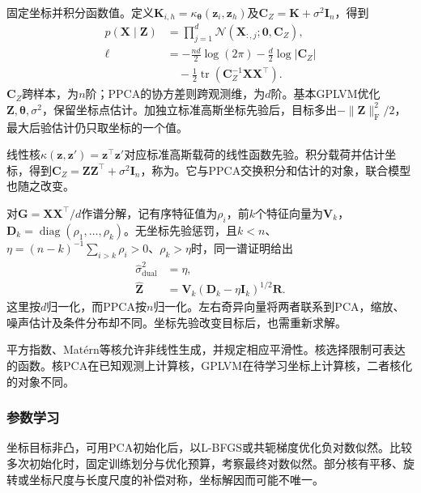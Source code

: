 固定坐标并积分函数值。定义$\bm{K}_{i,h}=\kappa_{\bm{\theta}}(\bm{z}_i,\bm{z}_h)$及$\bm{C}_Z=\bm{K}+\sigma^2\bm{I}_n$，得到
\begin{equation}
\label{eq:dim-gplvm-likelihood}
\begin{aligned}
p(\bm{X}\mid\bm{Z})
&=\prod_{j=1}^d
\mathcal{N}(\bm{X}_{:,j};\bm{0},\bm{C}_Z),\\
\ell&=-\frac{nd}{2}\log(2\pi)
-\frac{d}{2}\log|\bm{C}_Z|\\
&\quad-\frac{1}{2}
\operatorname{tr}(\bm{C}_Z^{-1}\bm{X}\bm{X}^\top).
\end{aligned}
\end{equation}
$\bm{C}_Z$跨样本，为$n$阶；PPCA的协方差则跨观测维，为$d$阶。基本GPLVM优化$\bm{Z},\bm{\theta},\sigma^2$，保留坐标点估计。加独立标准高斯坐标先验后，目标多出$-\lVert\bm{Z}\rVert_{\mathrm{F}}^2/2$，最大后验估计仍只取坐标的一个值。

线性核$\kappa(\bm{z},\bm{z}')=\bm{z}^\top\bm{z}'$对应标准高斯载荷的线性函数先验。积分载荷并估计坐标，得到$\bm{C}_Z=\bm{Z}\bm{Z}^\top+\sigma^2\bm{I}_n$，称为。它与PPCA交换积分和估计的对象，联合模型也随之改变。

对$\bm{G}=\bm{X}\bm{X}^\top/d$作谱分解，记有序特征值为$\rho_i$，前$k$个特征向量为$\bm{V}_k$，$\bm{D}_k=\operatorname{diag}(\rho_1,\ldots,\rho_k)$。无坐标先验惩罚，且$k<n$、$\eta=(n-k)^{-1}\sum_{i>k}\rho_i>0$、$\rho_k>\eta$时，同一谱证明给出
\begin{equation}
\label{eq:dim-gplvm-dual}
\begin{aligned}
\hat{\sigma}_{\mathrm{dual}}^2&=\eta,\\
\hat{\bm{Z}}&=\bm{V}_k(\bm{D}_k-\eta\bm{I}_k)^{1/2}\bm{R}.
\end{aligned}
\end{equation}
这里按$d$归一化，而PPCA按$n$归一化。左右奇异向量将两者联系到PCA，缩放、噪声估计及条件分布却不同。坐标先验改变目标后，也需重新求解。

平方指数、Matérn等核允许非线性生成，并规定相应平滑性。核选择限制可表达的函数。核PCA在已知观测上计算核，GPLVM在待学习坐标上计算核，二者核化的对象不同。

\subsubsection{参数学习}
\label{sec:dim-gplvm-learning}

坐标目标非凸，可用PCA初始化后，以L-BFGS或共轭梯度优化负对数似然。比较多次初始化时，固定训练划分与优化预算，考察最终对数似然。部分核有平移、旋转或坐标尺度与长度尺度的补偿对称，坐标解因而可能不唯一。

